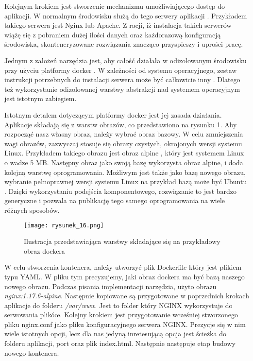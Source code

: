 Kolejnym krokiem jest stworzenie mechanizmu umożliwiającego dostęp do aplikacji. W normalnym środowisku służą do tego serwery aplikacji \cite{web-server}. Przykładem takiego serwera jest Nginx lub Apache.
Z racji, iż instalacja takich serwerów wiążę się z pobraniem dużej ilości danych oraz każdorazową konfiguracją środowiska, skonteneryzowane rozwiązania znacząco przyspieszy i uprości pracę.

Jednym z założeń narzędzia jest, aby całość działała w odizolowanym środowisku przy użyciu platformy docker \cite{docker}. W zależności od systemu operacyjnego, zestaw instrukcji potrzebnych do instalacji serwera może być całkowicie inny \cite{nginx-windows}\cite{nginx-linux}.
Dlatego też wykorzystanie odizolowanej warstwy abstrakcji nad systemem operacyjnym jest istotnym zabiegiem.

Istotnym detalem dotyczącym platformy docker jest jej zasada działania. Aplikacje składają się z warstw obrazów, co przedstawiono na rysunku \ref{fig:rysunek_16}.
Aby rozpocząć nasz własny obraz, należy wybrać obraz bazowy. W celu zmniejszenia wagi obrazów, zazwyczaj stosuje się obrazy czystych, okrojonych wersji systemu Linux.
Przykładem takiego obrazu jest obraz alpine \cite{docker-alpine}, który jest systemem Linux o wadze 5 MB. Następny obraz jako swoją bazę wykorzysta obraz alpine, i doda kolejną warstwę oprogramowania.
Możliwym jest także jako bazę nowego obrazu, wybranie pełnoprawnej wersji systemu Linux na przykład bazą może być Ubuntu \cite{ubuntu}.
Dzięki wykorzystaniu podejścia komponentowego, rozwiązanie to jest bardzo generyczne i pozwala na publikację tego samego oprogramowania na wiele różnych sposobów.

\begin{figure}[htbp]
    \centering
    \texttt{[image: rysunek\_16.png]}
    \caption{Ilustracja przedstawiająca warstwy składające się na  przykładowy obraz dockera \cite{docker-layers}}
    \label{fig:rysunek_16}
\end{figure}

W celu stworzenia kontenera, należy utworzyć plik Dockerfile który jest plikiem typu YAML. W pliku tym precyzujemy, jaki obraz dockera ma być bazą naszego nowego obrazu.
Podczas pisania implementacji narzędzia, użyto obrazu \emph{nginx:1.17.6-alpine}. Następnie kopiowane są przygotowane w poprzednich krokach aplikacje do folderu \emph{/var/www}.
Jest to folder który NGINX wykorzystuje do serwowania plikóœ. Kolejny krokiem jest przygotowanie wcześniej stworzonego pliku nginx.conf jako pliku konfiguracyjnego serwera NGINX.
Prezycje się w nim wiele istotnych opcji, lecz dla nas jedyną inretesującą opcja jest ścieżka do folderu aplikacji, port oraz plik index.html. Następnie następuje etap budowy nowego kontenera.

